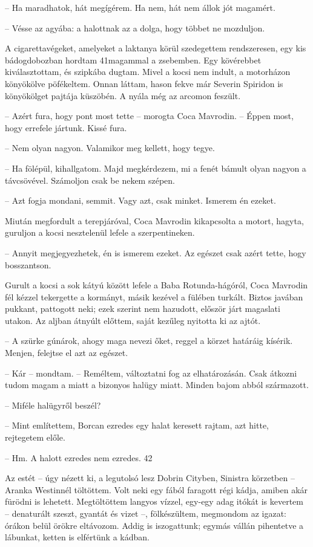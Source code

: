 \documentclass{IEEEtran}
\begin{document}
– Ha maradhatok, hát megígérem. Ha nem, hát nem állok jót magamért.

– Vésse az agyába: a halottnak az a dolga, hogy többet ne mozduljon.

A cigarettavégeket, amelyeket a laktanya körül szedegettem rendszeresen, egy
kis bádogdobozban hordtam 41magammal a zsebemben. Egy kövérebbet
kiválasztottam, és szipkába dugtam. Mivel a kocsi nem indult, a motorházon
könyökölve pöfékeltem. Onnan láttam, hason fekve már Severin Spiridon is
könyökölget pajtája küszöbén. A nyála még az arcomon feszült.

– Azért fura, hogy pont most tette – morogta Coca Mavrodin. – Éppen most, hogy
errefele jártunk. Kissé fura.

– Nem olyan nagyon. Valamikor meg kellett, hogy tegye.

– Ha fölépül, kihallgatom. Majd megkérdezem, mi a fenét bámult olyan nagyon a
távcsövével. Számoljon csak be nekem szépen.

– Azt fogja mondani, semmit. Vagy azt, csak minket. Ismerem én ezeket.

Miután megfordult a terepjáróval, Coca Mavrodin kikapcsolta a motort, hagyta,
guruljon a kocsi nesztelenül lefele a szerpentineken.

– Annyit megjegyezhetek, én is ismerem ezeket. Az egészet csak azért tette,
hogy bosszantson.

Gurult a kocsi a sok kátyú között lefele a Baba Rotunda-hágóról, Coca Mavrodin
fél kézzel tekergette a kormányt, másik kezével a fülében turkált. Biztos
javában pukkant, pattogott neki; ezek szerint nem hazudott, először járt
magaslati utakon. Az aljban átnyúlt előttem, saját kezűleg nyitotta ki az
ajtót.

– A szürke gúnárok, ahogy maga nevezi őket, reggel a körzet határáig kísérik.
Menjen, felejtse el azt az egészet.

– Kár – mondtam. – Reméltem, változtatni fog az elhatározásán. Csak átkozni
tudom magam a miatt a bizonyos halügy miatt. Minden bajom abból származott.

– Miféle halügyről beszél?

– Mint említettem, Borcan ezredes egy halat keresett rajtam, azt hitte,
rejtegetem előle.

– Hm. A halott ezredes nem ezredes.
42

Az estét – úgy nézett ki, a legutolsó lesz Dobrin Cityben, Sinistra körzetben
– Aranka Westinnél töltöttem. Volt neki egy fából faragott régi kádja, amiben
akár fürödni is lehetett. Megtöltöttem langyos vízzel, egy-egy adag itókát is
kevertem – denaturált szeszt, gyantát és vizet –, fölkészültem, megmondom az
igazat: órákon belül örökre eltávozom. Addig is iszogattunk; egymás vállán
pihentetve a lábunkat, ketten is elfértünk a kádban.
\end{document}
